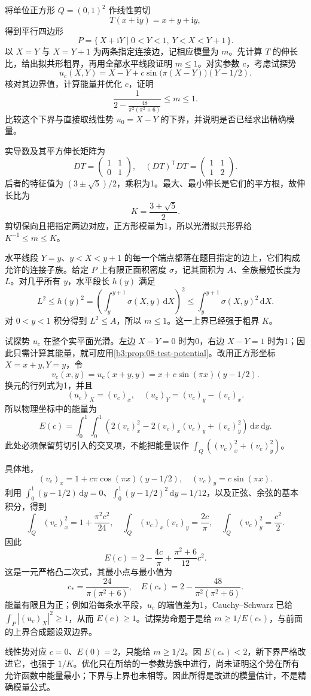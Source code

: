 \begin{exercise}\label{b3:ex:08-8}
将单位正方形 \(Q=(0,1)^2\) 作线性剪切
\[
 T(x+\mathrm{i}y)=x+y+\mathrm{i}y,
\]
得到平行四边形
\[
 P=\{\,X+\mathrm{i}Y\mid0<Y<1,\ Y<X<Y+1\,\}.
\]
以 \(X=Y\) 与 \(X=Y+1\) 为两条指定连接边，记相应模量为 \(m\)。先计算 \(T\) 的伸长比，给出拟共形粗界，再用全部水平线段证明 \(m\le1\)。对实参数 \(c\)，考虑试探势
\[
 u_c(X,Y)=X-Y+c\sin\bigl(\pi(X-Y)\bigr)(Y-1/2).
\]
核对其边界值，计算能量并优化 \(c\)，证明
\[
 \frac1{\displaystyle2-\frac{48}{\pi^2(\pi^2+6)}}
 \le m\le1.
\]
比较这个下界与直接取线性势 \(u_0=X-Y\) 的下界，并说明是否已经求出精确模量。
\end{exercise}
\begin{solution}
实导数及其平方伸长矩阵为
\[
 DT=\begin{pmatrix}1&1\\0&1\end{pmatrix},\quad
 (DT)^{\mathsf T}DT=\begin{pmatrix}1&1\\1&2\end{pmatrix}.
\]
后者的特征值为 \((3\pm\sqrt5)/2\)，乘积为1。最大、最小伸长是它们的平方根，故伸长比为
\[
 K=\frac{3+\sqrt5}{2}.
\]
剪切保向且把指定两边对应，正方形模量为1，所以光滑拟共形界给
\(K^{-1}\le m\le K\)。

水平线段 \(Y=y\)、\(y<X<y+1\) 的每一个端点都落在题目指定的边上，它们构成允许的连接子族。给定 \(P\) 上有限正面积密度 \(\sigma\)，记其面积为 \(A\)、全族最短长度为 \(L\)。对几乎所有 \(y\)，水平段长 \(h(y)\) 满足
\[
 L^2\le h(y)^2
 =\left(\int_y^{y+1}\sigma(X,y)\,\mathrm{d}X\right)^2
 \le\int_y^{y+1}\sigma(X,y)^2\,\mathrm{d}X.
\]
对 \(0<y<1\) 积分得到 \(L^2\le A\)，所以 \(m\le1\)。这一上界已经强于粗界 \(K\)。

试探势 \(u_c\) 在整个实平面光滑。左边 \(X-Y=0\) 时为0，右边 \(X-Y=1\) 时为1；因此只需计算其能量，就可应用\cref{b3:prop:08-test-potential}。改用正方形坐标 \(X=x+y,Y=y\)，令
\[
 v_c(x,y)=u_c(x+y,y)=x+c\sin(\pi x)(y-1/2).
\]
换元的行列式为1，并且
\[
 (u_c)_X=(v_c)_x,\quad
 (u_c)_Y=(v_c)_y-(v_c)_x.
\]
所以物理坐标中的能量为
\[
 E(c)=\int_0^1\int_0^1
 \left(2(v_c)_x^2-2(v_c)_x(v_c)_y+(v_c)_y^2\right)
 \,\mathrm{d}x\,\mathrm{d}y.
\]
此处必须保留剪切引入的交叉项，不能把能量误作 \(\int_Q((v_c)_x^2+(v_c)_y^2)\)。

具体地，
\[
 (v_c)_x=1+c\pi\cos(\pi x)(y-1/2),\quad
 (v_c)_y=c\sin(\pi x).
\]
利用 \(\int_0^1(y-1/2)\,\mathrm{d}y=0\)、\(\int_0^1(y-1/2)^2\,\mathrm{d}y=1/12\)，以及正弦、余弦的基本积分，得到
\[
 \int_Q(v_c)_x^2=1+\frac{\pi^2c^2}{24},\quad
 \int_Q(v_c)_x(v_c)_y=\frac{2c}{\pi},\quad
 \int_Q(v_c)_y^2=\frac{c^2}{2}.
\]
因此
\[
 E(c)=2-\frac{4c}{\pi}+\frac{\pi^2+6}{12}c^2.
\]
这是一元严格凸二次式，其最小点与最小值为
\[
 c_* =\frac{24}{\pi(\pi^2+6)},\quad
 E(c_*)=2-\frac{48}{\pi^2(\pi^2+6)}.
\]
能量有限且为正；例如沿每条水平段，\(u_c\) 的端值差为1，Cauchy--Schwarz 已给 \(\int_P|(u_c)_X|^2\ge1\)，从而 \(E(c)\ge1\)。试探势命题于是给 \(m\ge1/E(c_*)\)，与前面的上界合成题设双边界。

线性势对应 \(c=0\)、\(E(0)=2\)，只能给 \(m\ge1/2\)。因 \(E(c_*)<2\)，新下界严格改进它，也强于 \(1/K\)。优化只在所给的一参数势族中进行，尚未证明这个势在所有允许函数中能量最小；下界与上界也未相等。因此所得是改进的模量估计，不是精确模量公式。
\end{solution}
